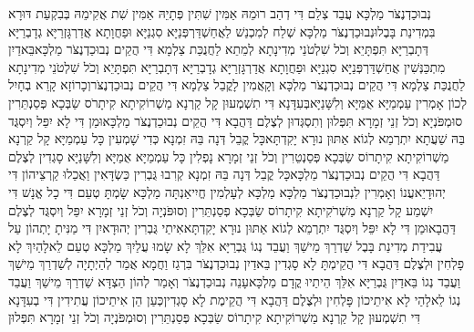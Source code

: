 \documentclass[../main/main.tex]{subfiles}
\begin{document}
\begin{multicols*}{\ncols}
נְבוּכַדְנֶצֹּר מַלְכָּא עֲבַד צְלֵם דִּי דְהַב רוּמֵהּ אַמִּין שִׁתִּין פְּתָיֵהּ אַמִּין שִׁת אֲקִימֵהּ בְּבִקְעַת דּוּרָא בִּמְדִינַת בָּבֶל\PreVerseSpace{}וּנְבוּכַדְנֶצֹּר מַלְכָּא שְׁלַח לְמִכְנַשׁ לַאֲחַשְׁדַּרְפְּנַיָּא סִגְנַיָּא וּפַחֲוָתָא אֲדַרְגָּזְרַיָּא גְדָבְרַיָּא דְּתָבְרַיָּא תִּפְתָּיֵא וְכֹל שִׁלְטֹנֵי מְדִינָתָא לְמֵתֵא לַחֲנֻכַּת צַלְמָא דִּי הֲקֵים נְבוּכַדְנֶצֹּר מַלְכָּא\PreVerseSpace{}בֵּאדַיִן מִתְכַּנְּשִׁין אֲחַשְׁדַּרְפְּנַיָּא סִגְנַיָּא וּפַחֲוָתָא אֲדַרְגָּזְרַיָּא גְדָבְרַיָּא דְּתָבְרַיָּא תִּפְתָּיֵא וְכֹל שִׁלְטֹנֵי מְדִינָתָא לַחֲנֻכַּת צַלְמָא דִּי הֲקֵים נְבוּכַדְנֶצֹּר מַלְכָּא וְקָאֲמִין לָקֳבֵל צַלְמָא דִּי הֲקֵים נְבוּכַדְנֶצֹּר\PreVerseSpace{}וְכָרוֹזָא קָרֵא בְחָיִל לְכוֹן אָמְרִין עַמְמַיָּא אֻמַּיָּא וְלִשָּׁנַיָּא\PreVerseSpace{}בְּעִדָּנָא דִּי תִשְׁמְעוּן קָל קַרְנָא מַשְׁרוֹקִיתָא קִיתָרֹס\SubEnd{} שַׂבְּכָא פְּסַנְתֵּרִין סוּמְפֹּנְיָא וְכֹל זְנֵי זְמָרָא תִּפְּלוּן וְתִסְגְּדוּן לְצֶלֶם דַּהֲבָא דִּי הֲקֵים נְבוּכַדְנֶצֹּר מַלְכָּא\PreVerseSpace{}וּמַן דִּי לָא יִפֵּל וְיִסְגֻּד בַּהּ שַׁעֲתָא יִתְרְמֵא לְגוֹא אַתּוּן נוּרָא יָקִדְתָּא\PreVerseSpace{}כָּל קֳבֵל דְּנָה בֵּהּ זִמְנָא כְּדִי שָׁמְעִין כָּל עַמְמַיָּא קָל קַרְנָא מַשְׁרוֹקִיתָא קִיתָרוֹס\SubEnd{} שַׂבְּכָא פְּסַנְטֵרִין וְכֹל זְנֵי זְמָרָא נָפְלִין כָּל עַמְמַיָּא אֻמַיָּא וְלִשָּׁנַיָּא סָגְדִין לְצֶלֶם דַּהֲבָא דִּי הֲקֵים נְבוּכַדְנֶצֹּר מַלְכָּא\PreVerseSpace{}כָּל קֳבֵל דְּנָה בֵּהּ זִמְנָא קְרִבוּ גֻּבְרִין כַּשְׂדָּאִין וַאֲכַלוּ קַרְצֵיהוֹן דִּי יְהוּדָיֵא\PreVerseSpace{}עֲנוֹ וְאָמְרִין לִנְבוּכַדְנֶצֹּר מַלְכָּא מַלְכָּא לְעָלְמִין חֱיִי\PreVerseSpace{}אַנְתָּה מַלְכָּא שָׂמְתָּ טְעֵם דִּי כָל אֱנָשׁ דִּי יִשְׁמַע קָל קַרְנָא מַשְׁרֹקִיתָא קִיתָרוֹס\SubEnd{} שַׂבְּכָא פְסַנְתֵּרִין וְסוּפֹּנְיָה\SubEnd{} וְכֹל זְנֵי זְמָרָא יִפֵּל וְיִסְגֻּד לְצֶלֶם דַּהֲבָא\PreVerseSpace{}וּמַן דִּי לָא יִפֵּל וְיִסְגֻּד יִתְרְמֵא לְגוֹא אַתּוּן נוּרָא יָקִדְתָּא\PreVerseSpace{}אִיתַי גֻּבְרִין יְהוּדָאיִן דִּי מַנִּיתָ יָתְהוֹן עַל עֲבִידַת מְדִינַת בָּבֶל שַׁדְרַךְ מֵישַׁךְ וַעֲבֵד נְגוֹ גֻּבְרַיָּא אִלֵּךְ לָא שָׂמוּ עֲלַיִךְ מַלְכָּא טְעֵם לֵאלָהַיִךְ לָא פָלְחִין וּלְצֶלֶם דַּהֲבָא דִּי הֲקֵימְתָּ לָא סָגְדִין \ClosedSection{}בֵּאדַיִן נְבוּכַדְנֶצֹּר בִּרְגַז וַחֲמָא אֲמַר לְהַיְתָיָה לְשַׁדְרַךְ מֵישַׁךְ וַעֲבֵד נְגוֹ בֵּאדַיִן גֻּבְרַיָּא אִלֵּךְ הֵיתַיוּ קֳדָם מַלְכָּא\PreVerseSpace{}עָנֵה נְבוּכַדְנֶצֹּר וְאָמַר לְהוֹן הַצְדָּא שַׁדְרַךְ מֵישַׁךְ וַעֲבֵד נְגוֹ לֵאלָהַי לָא אִיתֵיכוֹן פָּלְחִין וּלְצֶלֶם דַּהֲבָא דִּי הֲקֵימֶת לָא סָגְדִין\PreVerseSpace{}כְּעַן הֵן אִיתֵיכוֹן עֲתִידִין דִּי בְעִדָּנָא דִּי תִשְׁמְעוּן קָל קַרְנָא מַשְׁרוֹקִיתָא קִיתָרוֹס\SubEnd{} שַׂבְּכָא פְּסַנְתֵּרִין וְסוּמְפֹּנְיָה וְכֹל זְנֵי זְמָרָא תִּפְּלוּן 
\end{multicols*}
\end{document}
